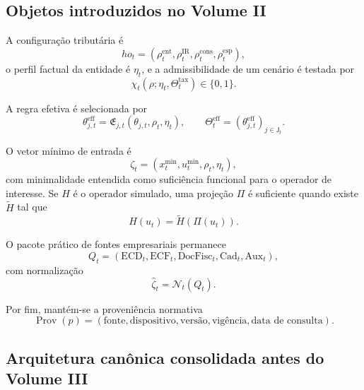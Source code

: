 \documentclass[11pt,a4paper]{article}
\newcommand{\cN}{\mathcal{N}}
\newcommand{\Prov}{\operatorname{Prov}}
\begin{document}
\subsection{Objetos introduzidos no Volume II}

A configuração tributária é
\begin{equation}
\boxed{
ho_t=(\rho_t^{\mathrm{ent}},\rho_t^{\mathrm{IR}},\rho_t^{\mathrm{cons}},\rho_t^{\mathrm{esp}}),}
\end{equation}
o perfil factual da entidade é $\eta_t$, e a admissibilidade de um cenário é testada por
\begin{equation}
\boxed{
\chi_t(\rho;\eta_t,\Theta_t^{\mathrm{tax}})\in\{0,1\}.
}
\end{equation}

A regra efetiva é selecionada por
\begin{equation}
\boxed{
\theta_{j,t}^{\mathrm{eff}}=\mathfrak E_{j,t}(\theta_{j,t},\rho_t,\eta_t),
\qquad
\Theta_t^{\mathrm{eff}}=(\theta_{j,t}^{\mathrm{eff}})_{j\in\mathsf J_t}.
}
\label{eq:effective-rules}
\end{equation}

O vetor mínimo de entrada é
\begin{equation}
\boxed{
\zeta_t=(x_t^{\min},u_t^{\min},\rho_t,\eta_t),
}
\label{eq:zeta-III}
\end{equation}
com minimalidade entendida como suficiência funcional para o operador de interesse. Se $H$ é o operador simulado, uma projeção $\Pi$ é suficiente quando existe $\widetilde H$ tal que
\begin{equation}
H(u_t)=\widetilde H(\Pi(u_t)).
\end{equation}

O pacote prático de fontes empresariais permanece
\begin{equation}
\boxed{
Q_t=(\mathrm{ECD}_t,\mathrm{ECF}_t,\mathrm{DocFisc}_t,\mathrm{Cad}_t,\mathrm{Aux}_t),
}
\end{equation}
com normalização
\begin{equation}
\boxed{\widehat\zeta_t=\cN_t(Q_t).}
\end{equation}

Por fim, mantém-se a proveniência normativa
\begin{equation}
\boxed{
\Prov(p)=(\text{fonte},\text{dispositivo},\text{versão},\text{vigência},\text{data de consulta}).
}
\end{equation}

\subsection{Arquitetura canônica consolidada antes do Volume III}
\end{document}
